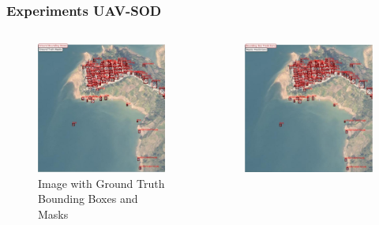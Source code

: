 \documentclass{beamer}
\begin{document}
\begin{frame}[t]
  \scriptsize
  \frametitle{Experiments UAV-SOD}
  \begin{columns}
      \begin{column}{0.5\textwidth}
      \centering
      \begin{figure}
        \includegraphics[scale=0.22]{Figures/uav_ground_truth.jpg}
        \caption{Image with Ground Truth Bounding Boxes and Masks}
        \label{fig:pre-process}
      \end{figure}
    \end{column}
    \begin{column}{0.5\textwidth}
      \centering
      \begin{figure}
        \includegraphics[scale=0.22]{Figures/uav_predictions.jpg}

\end{figure}
\end{column}
\end{columns}
\end{frame}
\end{document}
